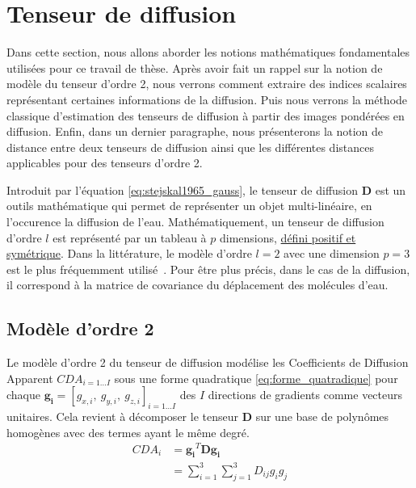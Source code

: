 \section{Tenseur de diffusion}
Dans cette section, nous allons aborder les notions mathématiques fondamentales utilisées pour ce travail de thèse.
Après avoir fait un rappel sur la notion de modèle du tenseur d'ordre 2,
nous verrons comment extraire des indices scalaires représentant certaines informations de la diffusion.
Puis nous verrons la méthode classique d'estimation des tenseurs de diffusion à partir des images pondérées en diffusion.
Enfin, dans un dernier paragraphe, nous présenterons la notion de distance entre deux tenseurs de diffusion ainsi que 
les différentes distances applicables pour des tenseurs d'ordre 2.

Introduit par l'équation \eqref{eq:stejskal1965_gauss}, le tenseur de diffusion $\mathbf{D}$ est un outils mathématique 
qui permet de représenter un objet multi-linéaire, en l'occurence la diffusion de l'eau.
Mathématiquement, un tenseur de diffusion d'ordre $l$ est représenté par un tableau à $p$ dimensions, \underline{défini positif et symétrique}.
Dans la littérature, le modèle d'ordre $l=2$ avec une dimension $p=3$ est le plus fréquemment utilisé~\cite{Basser1994}.
Pour être plus précis, dans le cas de la diffusion, il correspond à la matrice de covariance du déplacement des molécules d'eau.


\subsection{Modèle d'ordre 2}
Le modèle d'ordre 2 du tenseur de diffusion modélise les Coefficients de Diffusion Apparent $CDA_{i=1\dots I}$ sous une forme quadratique \eqref{eq:forme_quatradique}
pour chaque $\mathbf{g_i} = \left[g_{x,i},\ g_{y,i},\ g_{z,i}\right]_{i=1\dots I}$ des $I$ directions de gradients comme vecteurs unitaires.
Cela revient à décomposer le tenseur $\mathbf{D}$ sur une base de polynômes homogènes avec des termes ayant le même degré.
\begin{align}
    CDA_i &= \mathbf{g_i}^T\mathbf{D}\mathbf{g_i} \nonumber \\ 
      &=\sum_{i=1}^{3} \sum_{j=1}^{3} D_{ij}g_ig_j
    \label{eq:forme_quatradique}
\end{align}

